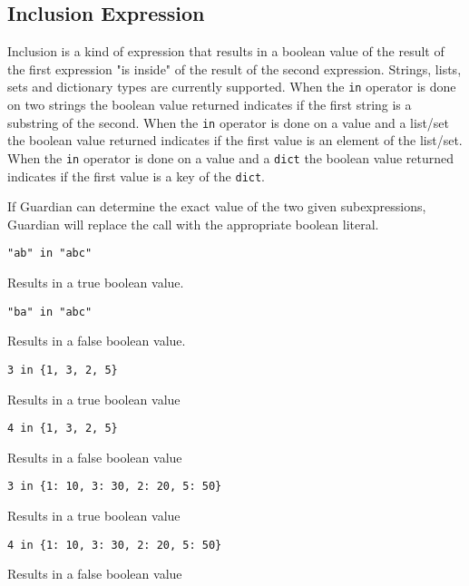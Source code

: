 
\subsection{Inclusion Expression}
{
	Inclusion is a kind of expression that results in a boolean value of
	the result of the first expression "is inside" of the result of the
	second expression. Strings, lists, sets and dictionary types are currently
	supported.
	When the \texttt{in} operator is done
	on two strings the boolean value returned indicates if the first string
	is a substring of the second.
	When the \texttt{in} operator is done on a value and a list/set
	the boolean value returned indicates if the first value
	is an element of the list/set.
	When the \texttt{in} operator is done on a value and a \texttt{dict}
	the boolean value returned indicates if the first value
	is a key of the \texttt{dict}.
	
	If Guardian can determine the exact value of the two given subexpressions,
	Guardian will replace the call with the appropriate boolean literal.
	
	\begin{itemize}
	{
		\item \texttt{"ab" in "abc"}
		
			Results in a true boolean value.
		
		\item \texttt{"ba" in "abc"}
		
			Results in a false boolean value.
		
		\item \texttt{3 in \{1, 3, 2, 5\}}
		
			Results in a true boolean value
		
		\item \texttt{4 in \{1, 3, 2, 5\}}
		
			Results in a false boolean value
		
		\item \texttt{3 in \{1: 10, 3: 30, 2: 20, 5: 50\}}
		
			Results in a true boolean value
		
		\item \texttt{4 in \{1: 10, 3: 30, 2: 20, 5: 50\}}
		
			Results in a false boolean value
	}
	\end{itemize}
}
